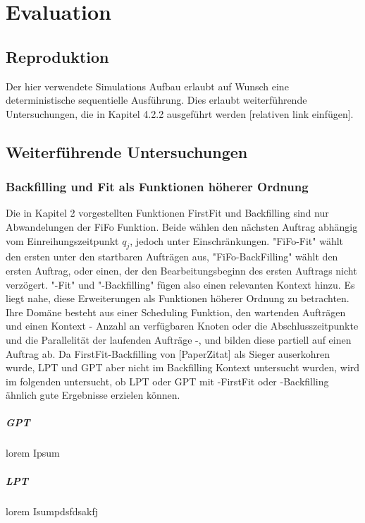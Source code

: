 \chapter{Evaluation}
\label{chap:ein}

\section{Reproduktion}

Der hier verwendete Simulations Aufbau erlaubt auf Wunsch eine deterministische sequentielle Ausführung. Dies erlaubt weiterführende Untersuchungen, die in Kapitel 4.2.2 ausgeführt werden [relativen link einfügen].

\section{Weiterführende Untersuchungen}

\subsection{Backfilling und Fit als Funktionen höherer Ordnung}

Die in Kapitel 2 vorgestellten Funktionen FirstFit und Backfilling sind nur Abwandelungen der FiFo Funktion. Beide wählen den nächsten Auftrag abhängig vom Einreihungszeitpunkt $q_j$, jedoch unter Einschränkungen. "FiFo-Fit" wählt den ersten unter den startbaren Aufträgen aus, "FiFo-BackFilling" wählt den ersten Auftrag, oder einen, der den Bearbeitungsbeginn des ersten Auftrags nicht verzögert. "-Fit" und "-Backfilling" fügen also einen relevanten Kontext hinzu. Es liegt nahe, diese Erweiterungen als Funktionen höherer Ordnung zu betrachten. Ihre Domäne besteht aus einer Scheduling Funktion, den wartenden Aufträgen und einen Kontext - Anzahl an verfügbaren Knoten oder die Abschlusszeitpunkte und die Parallelität der laufenden Aufträge -, und bilden diese partiell auf einen Auftrag ab. 
Da FirstFit-Backfilling von [PaperZitat] als Sieger auserkohren wurde, LPT und GPT aber nicht im Backfilling Kontext untersucht wurden, wird im folgenden untersucht, ob LPT oder GPT mit -FirstFit oder -Backfilling ähnlich gute Ergebnisse erzielen können.

\paragraph{GPT}
lorem Ipsum

\paragraph{LPT}
lorem Isumpdsfdsakfj



